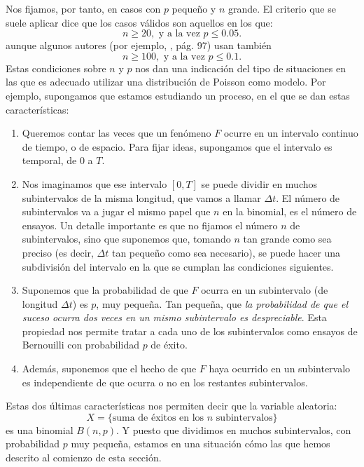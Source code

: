 Nos fijamos, por tanto, en casos con $p$ pequeño y $n$ grande. El criterio que se suele aplicar
dice que los casos válidos son aquellos en los que:
\[n\geq 20, \mbox{ y a la vez }p\leq 0.05.\]
aunque algunos autores (por ejemplo, \cite{rosner2011fundamentals}, pág. 97) usan también
\[n\geq 100, \mbox{ y a la vez }p\leq 0.1.\]
Estas condiciones sobre $n$ y $p$ nos dan una indicación del tipo de situaciones en las que es
adecuado utilizar una distribución de Poisson como modelo. Por ejemplo, supongamos
que estamos estudiando un proceso, en el que se dan estas características:
      \begin{enumerate}
        \item Queremos contar las veces que un fenómeno $F$ ocurre en un intervalo continuo de
            tiempo, o de espacio. Para fijar ideas, supongamos que el intervalo es temporal, de
            $0$ a $T$.

        \item Nos imaginamos que ese intervalo $[0,T]$ se puede dividir en muchos subintervalos
            de la misma longitud, que vamos a llamar $\Delta t$. El número de subintervalos va a
            jugar el mismo papel que $n$ en la binomial, es el número de ensayos. Un detalle
            importante es que no fijamos el número $n$ de subintervalos, sino que suponemos que,
            tomando $n$ tan grande como sea preciso (es decir, $\Delta t$ tan pequeño como sea
            necesario), se puede hacer una subdivisión del intervalo en la que se cumplan las
            condiciones siguientes.

        \item Suponemos que la probabilidad de que $F$ ocurra en un subintervalo (de longitud
            $\Delta t$) es $p$, muy pequeña. Tan pequeña, que  {\em la probabilidad de que el
            suceso ocurra dos veces en un mismo subintervalo es despreciable}.  Esta propiedad
            nos permite tratar a cada uno de los subintervalos como ensayos de Bernouilli con
            probabilidad $p$ de éxito.

        \item Además, suponemos que el hecho de que $F$ haya ocurrido en un subintervalo es
            independiente de que ocurra o no en los restantes subintervalos.
      \end{enumerate}
Estas dos últimas características nos permiten decir que la variable aleatoria:
\[X=\{\mbox{suma de éxitos en los $n$ subintervalos}\}\]
es una binomial $B(n,p)$. Y puesto que dividimos en muchos subintervalos, con probabilidad $p$ muy
pequeña, estamos en una situación cómo las que hemos descrito al comienzo de esta sección.


